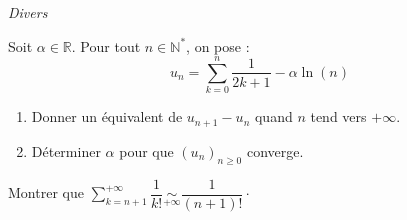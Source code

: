 \documentclass[a4paper,10pt]{report}
\newcommand{\Sum}[2]{\ensuremath{\textstyle{\sum\limits_{#1}^{#2}}}}
\begin{document}
\medskip

\begin{center}
\textit{{ {\large Divers}}}
\end{center}

\medskip

\begin{Exa}[\ding{80}] Soit $\alpha \in \mathbb{R}$. Pour tout $n \in \mathbb{N}^*$, on pose :
$$ u_n = \sum_{k=0}^n \frac{1}{2k+1} -  \alpha \ln(n)$$

\begin{enumerate}
\item Donner un équivalent de $u_{n+1}-u_n$ quand $n$ tend vers $+ \infty$.
\item Déterminer $\alpha$ pour que $(u_n)_{n \geq 0}$ converge.
\end{enumerate}
\end{Exa} 


\begin{Exa}[\ding{80}] Montrer que $\Sum{k=n+1}{+ \infty} \dfrac{1}{k!} \underset{ + \infty}{\sim} \dfrac{1}{(n+1)!} \cdot$ \end{Exa}
\end{document}

